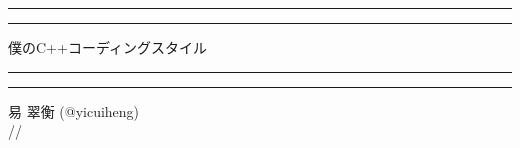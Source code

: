 %
%

\begin{titlepage}
  \centering%
  \vspace*{8\baselineskip}
  \rule{\textwidth}{2pt}\vspace*{-\baselineskip}\vspace*{4pt}
  \rule{\textwidth}{1pt}%
  \vspace*{\baselineskip}%
  {\Huge 僕のC++コーディングスタイル}%
  \vspace*{0.5\baselineskip}%
  \rule{\textwidth}{1pt}\vspace*{-\baselineskip}\vspace*{5pt}
  \rule{\textwidth}{2pt}%
  \vspace*{20\baselineskip}

  {\Large 易 翠衡 (@yicuiheng)} \\
  {\large \number\year/\number\month/\number\day}
\end{titlepage}
